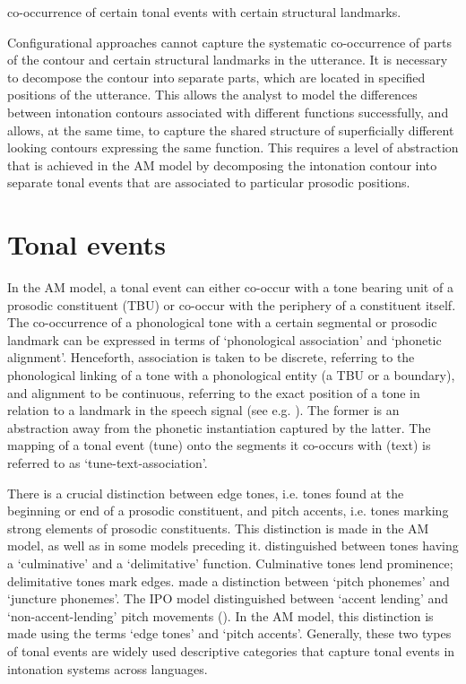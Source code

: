 co-occurrence of certain tonal events with certain structural landmarks.

Configurational approaches cannot capture the systematic co-occurrence of parts of the contour and certain structural landmarks in the utterance. It is necessary to decompose the contour into separate parts, which are located in specified positions of the utterance. This allows the analyst to model the differences between intonation contours associated with different functions successfully, and allows, at the same time, to capture the shared structure of superficially different looking contours expressing the same function. This requires a level of abstraction that is achieved in the AM model by decomposing the intonation contour into separate tonal events that are associated to particular prosodic positions.
   
\section{Tonal events}\label{sec:2.3}
In the AM model, a tonal event can either co-occur with a tone bearing unit of a prosodic constituent (TBU) or co-occur with the periphery of a constituent itself. The co-occurrence of a phonological tone with a certain segmental or prosodic landmark can be expressed in terms of ‘phonological association’ and ‘phonetic alignment’. Henceforth, association is taken to be discrete, referring to the phonological linking of a tone with a phonological entity (a TBU or a boundary), and alignment to be continuous, referring to the exact position of a tone in relation to a landmark in the speech signal (see e.g. \citealt{Ladd2008}). The former is an abstraction away from the phonetic instantiation captured by the latter. The mapping of a tonal event (tune) onto the segments it co-occurs with (text) is referred to as ‘tune-text-association’.

There is a crucial distinction between edge tones, i.e. tones found at the beginning or end of a prosodic constituent, and pitch accents, i.e. tones marking strong elements of prosodic constituents. This distinction is made in the AM model, as well as in some models preceding it. \citet{Trubeckoj1939} distinguished between tones having a ‘culminative’ and a ‘delimitative’ function. Culminative tones lend prominence; delimitative tones mark edges. \citet{TragerSmith1951} made a distinction between ‘pitch phonemes’ and ‘juncture phonemes’. The IPO model distinguished between ‘accent lending’ and ‘non-accent-lending’ pitch movements (\citealt{CohenHart1968,HartCohen1973,HartCollier1975}). In the AM model, this distinction is made using the terms ‘edge tones’ and ‘pitch accents’. Generally, these two types of tonal events are widely used descriptive categories that capture tonal events in intonation systems across languages.

